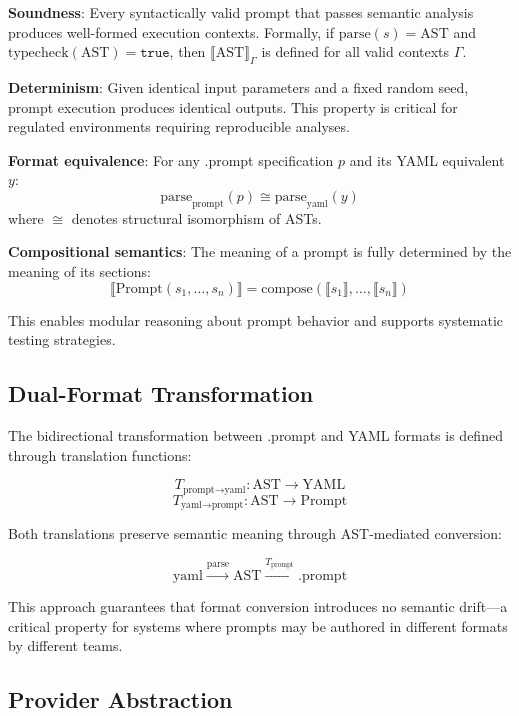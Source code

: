 \documentclass[11pt,a4paper]{article}
\begin{document}
\textbf{Soundness}: Every syntactically valid prompt that passes semantic analysis produces well-formed execution contexts. Formally, if $\text{parse}(s) = \text{AST}$ and $\text{typecheck}(\text{AST}) = \texttt{true}$, then $\llbracket \text{AST} \rrbracket_\Gamma$ is defined for all valid contexts $\Gamma$.

\textbf{Determinism}: Given identical input parameters and a fixed random seed, prompt execution produces identical outputs. This property is critical for regulated environments requiring reproducible analyses.

\textbf{Format equivalence}: For any .prompt specification $p$ and its YAML equivalent $y$:
$$\text{parse}_{\text{prompt}}(p) \cong \text{parse}_{\text{yaml}}(y)$$
where $\cong$ denotes structural isomorphism of ASTs.

\textbf{Compositional semantics}: The meaning of a prompt is fully determined by the meaning of its sections:
$$\llbracket \text{Prompt}(s_1, \ldots, s_n) \rrbracket = \text{compose}(\llbracket s_1 \rrbracket, \ldots, \llbracket s_n \rrbracket)$$

This enables modular reasoning about prompt behavior and supports systematic testing strategies.

\subsection{Dual-Format Transformation}

The bidirectional transformation between .prompt and YAML formats is defined through translation functions:

$$T_{\text{prompt} \rightarrow \text{yaml}}: \text{AST} \rightarrow \text{YAML}$$
$$T_{\text{yaml} \rightarrow \text{prompt}}: \text{AST} \rightarrow \text{Prompt}$$

Both translations preserve semantic meaning through AST-mediated conversion:

$$\text{yaml} \xrightarrow{\text{parse}} \text{AST} \xrightarrow{T_{\text{prompt}}} \text{.prompt}$$

This approach guarantees that format conversion introduces no semantic drift—a critical property for systems where prompts may be authored in different formats by different teams.

\subsection{Provider Abstraction}
\end{document}
